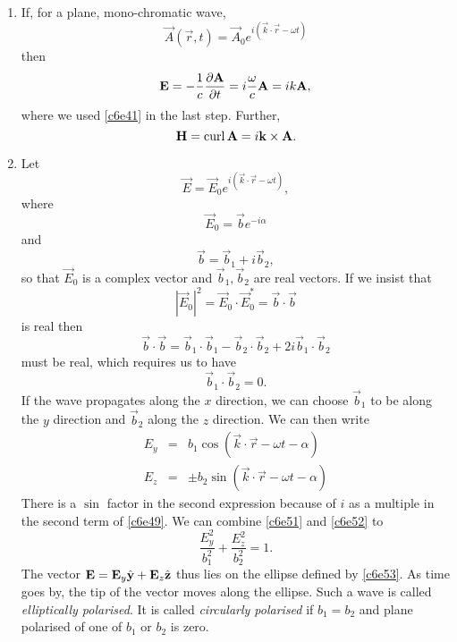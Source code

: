 \begin{enumerate}
\item If, for a plane, mono-chromatic wave,
\begin{equation}\label{c6e44}
\vec{A}(\vec{r}, t) = \vec{A}_0e^{i(\vec{k}\cdot\vec{r} - \omega t)}
\end{equation}
then
\begin{equation}\label{c6e45}
\mathbf{E} = -\frac{1}{c}\frac{\partial{\mathbf{A}}}{\partial{t}} = i\frac{\omega}{c}\mathbf{A} = ik\mathbf{A},
\end{equation}
where we used \eqref{c6e41} in the last step. Further,
\begin{equation}\label{c6e46}
\mathbf{H} = \operatorname{curl}\mathbf{A} = i\mathbf{k}\times\mathbf{A}.
\end{equation}

\item Let 
\begin{equation}\label{c6e47}
\vec{E} = \vec{E}_0 e^{i(\vec{k}\cdot\vec{r} - \omega t)},
\end{equation}
where
\begin{equation}\label{c6e48}
\vec{E}_0 = \vec{b}e^{-i\alpha}
\end{equation}
and
\begin{equation}\label{c6e49}
\vec{b} = \vec{b}_1 + i\vec{b}_2,
\end{equation}
so that $\vec{E}_0$ is a complex vector and $\vec{b}_1, \vec{b}_2$ are real 
vectors. If we insist that
\[
|\vec{E}_0|^2 = \vec{E}_0\cdot\vec{E}_0^\ast = \vec{b}\cdot\vec{b}
\]
is real then
\[
\vec{b}\cdot\vec{b} = \vec{b}_1\cdot\vec{b}_1 - \vec{b}_2\cdot\vec{b}_2 + 
2i\vec{b}_1\cdot\vec{b}_2
\]
must be real, which requires us to have
\begin{equation}\label{c6e50}
\vec{b}_1\cdot\vec{b}_2 = 0.
\end{equation}
If the wave propagates along the $x$ direction, we can choose $\vec{b}_1$ to be
along the $y$ direction and $\vec{b}_2$ along the $z$ direction. We can then 
write
\begin{eqnarray}
E_y &=& b_1\cos(\vec{k}\cdot\vec{r} - \omega t - \alpha) \label{c6e51} \\
E_z &=& \pm b_2\sin(\vec{k}\cdot\vec{r} - \omega t - \alpha) \label{c6e52}
\end{eqnarray}
There is a $\sin$ factor in the second expression because of $i$ as a multiple
in the second term of \eqref{c6e49}. We can combine \eqref{c6e51} and 
\eqref{c6e52} to
\begin{equation}\label{c6e53}
\frac{E_y^2}{b_1^2} + \frac{E_z^2}{b_2^2} = 1.
\end{equation}
The vector $\mathbf{E} = \mathbf{E}_y\hat{\mathbf{y}} + \mathbf{E}_z\hat{\mathbf{z}}$ thus lies on the ellipse
defined by \eqref{c6e53}. As time goes by, the tip of the vector moves along the
ellipse. Such a wave is called \emph{elliptically polarised}. It is called \emph{
circularly polarised} if $b_1 = b_2$ and plane polarised of one of $b_1$ or $b_2$
is zero.


\end{enumerate}
